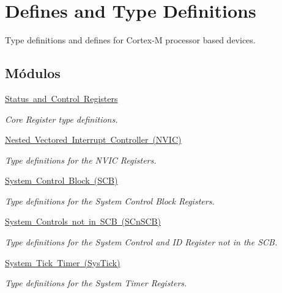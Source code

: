 \hypertarget{group___c_m_s_i_s__core__register}{}\section{Defines and Type Definitions}
\label{group___c_m_s_i_s__core__register}


Type definitions and defines for Cortex-\/M processor based devices.  


\subsection*{Módulos}
\begin{DoxyCompactItemize}
\item 
\mbox{\hyperlink{group___c_m_s_i_s___c_o_r_e}{Status and Control Registers}}
\begin{DoxyCompactList}\small\item\em Core Register type definitions. \end{DoxyCompactList}\item 
\mbox{\hyperlink{group___c_m_s_i_s___n_v_i_c}{Nested Vectored Interrupt Controller (\+N\+V\+I\+C)}}
\begin{DoxyCompactList}\small\item\em Type definitions for the N\+V\+IC Registers. \end{DoxyCompactList}\item 
\mbox{\hyperlink{group___c_m_s_i_s___s_c_b}{System Control Block (\+S\+C\+B)}}
\begin{DoxyCompactList}\small\item\em Type definitions for the System Control Block Registers. \end{DoxyCompactList}\item 
\mbox{\hyperlink{group___c_m_s_i_s___s_cn_s_c_b}{System Controls not in S\+C\+B (\+S\+Cn\+S\+C\+B)}}
\begin{DoxyCompactList}\small\item\em Type definitions for the System Control and ID Register not in the S\+CB. \end{DoxyCompactList}\item 
\mbox{\hyperlink{group___c_m_s_i_s___sys_tick}{System Tick Timer (\+Sys\+Tick)}}
\begin{DoxyCompactList}\small\item\em Type definitions for the System Timer Registers. \end{DoxyCompactList}\item 

\end{DoxyCompactItemize}
